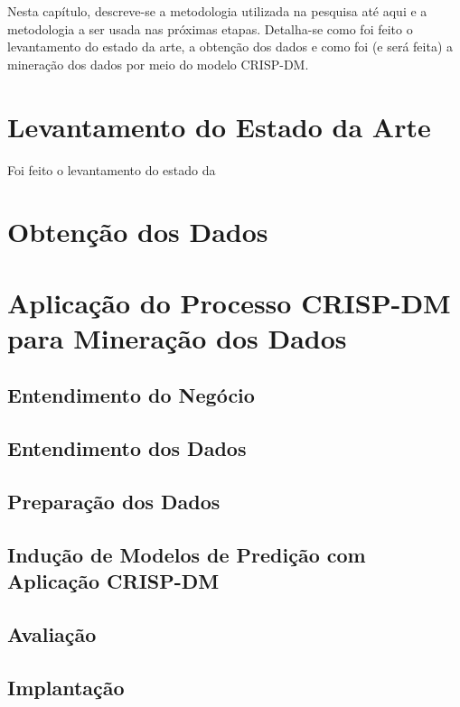 Nesta capítulo, descreve-se a metodologia utilizada na pesquisa até aqui e a
metodologia a ser usada nas próximas etapas. Detalha-se como foi feito o levantamento
do estado da arte, a obtenção dos dados e como foi (e será feita) a mineração dos
dados por meio do modelo CRISP-DM.

\section{Levantamento do Estado da Arte}
Foi feito o levantamento do estado da 

\section{Obtenção dos Dados}
\section{Aplicação do Processo CRISP-DM para Mineração dos Dados}

\subsection{Entendimento do Negócio}

\subsection{Entendimento dos Dados}

\subsection{Preparação dos Dados}

\subsection{Indução de Modelos de Predição com Aplicação CRISP-DM}

\subsection{Avaliação}

\subsection{Implantação}
